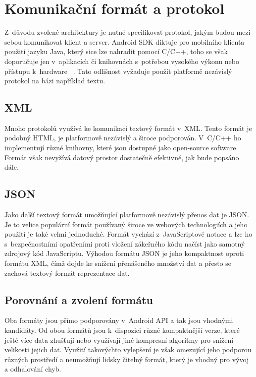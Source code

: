 \documentclass[thesis=B,czech]{FITthesis}[2013/10/20]
\begin{document}
\section{Komunikační formát a protokol}

Z~důvodu zvolené architektury je nutné specifikovat protokol, jakým budou mezi sebou komunikovat klient a server. Android SDK diktuje pro mobilního klienta použití jazyku Java, který sice lze nahradit pomocí C/C++, toho se však doporučuje jen v~aplikacích či knihovnách s~potřebou vysokého výkonu nebo přístupu k~hardware ~\cite{android_ndk}. Tato odlišnost vyžaduje použít platformě nezávislý protokol na bázi například textu.

\subsection{XML}

Mnoho protokolů využívá ke komunikaci textový formát v~XML. Tento formát je podobný HTML, je platformově nezávislý a široce podporován. V~C/C++ ho implementují různé knihovny, které jsou dostupné jako open-source software. Formát však nevyžívá datový prostor dostatečně efektivně, jak bude popsáno dále.

\subsection{JSON}

Jako další textový formát umožňující platformově nezávislý přenos dat je JSON. Je to velice populární formát používaný široce ve webových technologiích a jeho použití je také velmi jednoduché. Formát vychází z~JavaScriptové notace a lze ho s~bezpečnostními opatřeními proti vložení zákeřného kódu načíst jako samotný zdrojový kód JavaScriptu. Výhodou formátu JSON je jeho kompaktnost oproti formátu XML, čímž dojde ke snížení přenášeného množství dat a přesto se zachová textový formát reprezentace dat.

\subsection{Porovnání a zvolení formátu}

Oba formáty jsou přímo podporovány v~Android API a tak jsou vhodnými kandidáty. Od obou formátů jsou k~dispozici různé kompaktnější verze, které ještě více data zhušťují nebo využívají jiné kompresní algoritmy pro snížení velikosti jejich dat. Využití takovýchto vylepšení je však omezující jeho podporou různých prostředí a neumožňují lidsky čitelný formát, který je vhodný pro vývoj a odhalování chyb.
\end{document}
